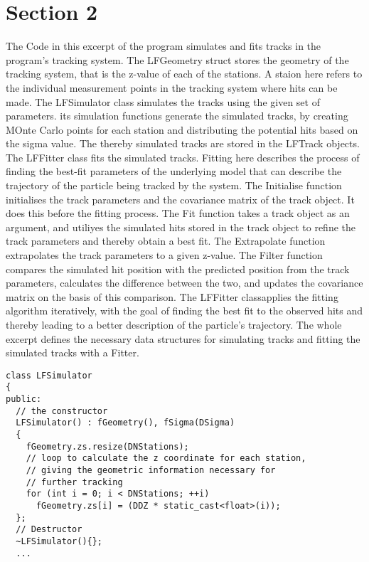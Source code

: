 \documentclass{article}
\begin{document}
\section*{Section 2}
The Code in this excerpt of the program simulates and fits tracks in the program's tracking system.  The LFGeometry struct stores the geometry of the tracking system, that is the z-value of each of the stations. A staion here refers to the individual measurement points in the tracking system where hits can be made. The LFSimulator class simulates the tracks using the given set of parameters. its simulation functions generate the simulated tracks, by creating MOnte Carlo points for each station and distributing the potential hits based on the sigma value. The thereby simulated tracks are stored in the LFTrack objects.  
The LFFitter class fits the simulated tracks. Fitting here describes the process of finding the best-fit parameters of the underlying model that can describe the trajectory of the particle being tracked by the system. The Initialise function initialises the track parameters and the covariance matrix of the track object. It does this before the fitting process. The Fit function takes a track object as an argument, and utiliyes the simulated hits stored in the track object to refine the track parameters and thereby obtain a best fit. The Extrapolate function extrapolates the track parameters to a given z-value. The Filter function compares the simulated hit position with the predicted position from the track parameters, calculates the difference between the two, and updates the covariance matrix on the basis of this comparison. The LFFitter classapplies the fitting algorithm iteratively, with the goal of finding the best fit to the observed hits and thereby leading to a better description of the particle's trajectory.
The whole excerpt defines the necessary data structures for simulating tracks and fitting the simulated tracks with a Fitter.
\\
\begin{lstlisting}[LFSSimulator Excerpt]
 class LFSimulator
{
public:
  // the constructor
  LFSimulator() : fGeometry(), fSigma(DSigma)
  {
    fGeometry.zs.resize(DNStations);
    // loop to calculate the z coordinate for each station,
    // giving the geometric information necessary for
    // further tracking
    for (int i = 0; i < DNStations; ++i)
      fGeometry.zs[i] = (DDZ * static_cast<float>(i));
  };
  // Destructor
  ~LFSimulator(){};
  ...
\end{lstlisting}
\end{document}

